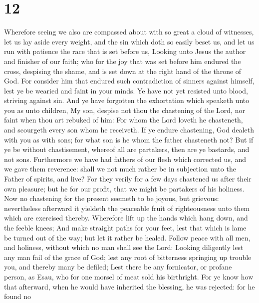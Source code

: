 \hypertarget{section-11}{%
\section{12}\label{section-11}}

 Wherefore seeing we also are compassed about with so great
a cloud of witnesses, let us lay aside every weight, and the sin which
doth so easily beset us, and let us run with patience the race that is
set before us,  Looking unto Jesus the author and finisher
of our faith; who for the joy that was set before him endured the cross,
despising the shame, and is set down at the right hand of the throne of
God.  For consider him that endured such contradiction of
sinners against himself, lest ye be wearied and faint in your minds.
 Ye have not yet resisted unto blood, striving against sin.
 And ye have forgotten the exhortation which speaketh unto
you as unto children, My son, despise not thou the chastening of the
Lord, nor faint when thou art rebuked of him:  For whom the
Lord loveth he chasteneth, and scourgeth every son whom he receiveth.
 If ye endure chastening, God dealeth with you as with sons;
for what son is he whom the father chasteneth not?  But if
ye be without chastisement, whereof all are partakers, then are ye
bastards, and not sons.  Furthermore we have had fathers of
our flesh which corrected us, and we gave them reverence: shall we not
much rather be in subjection unto the Father of spirits, and live?
 For they verily for a few days chastened us after their
own pleasure; but he for our profit, that we might be partakers of his
holiness.  Now no chastening for the present seemeth to be
joyous, but grievous: nevertheless afterward it yieldeth the peaceable
fruit of righteousness unto them which are exercised thereby.
 Wherefore lift up the hands which hang down, and the
feeble knees;  And make straight paths for your feet, lest
that which is lame be turned out of the way; but let it rather be
healed.  Follow peace with all men, and holiness, without
which no man shall see the Lord:  Looking diligently lest
any man fail of the grace of God; lest any root of bitterness springing
up trouble you, and thereby many be defiled;  Lest there be
any fornicator, or profane person, as Esau, who for one morsel of meat
sold his birthright.  For ye know how that afterward, when
he would have inherited the blessing, he was rejected: for he found no

